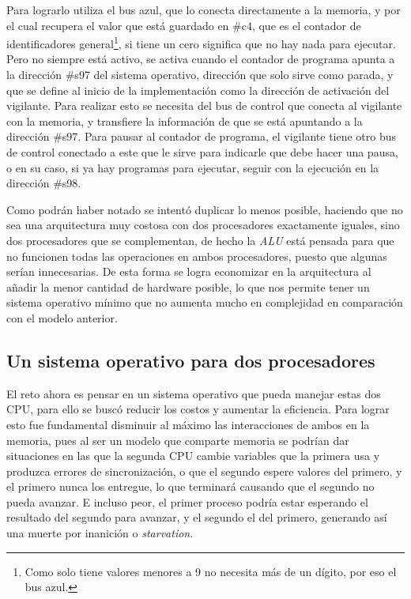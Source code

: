 \documentclass[letterpaper,12pt,oneside]{book}
\begin{document}
        Para lograrlo utiliza el bus azul, que lo conecta directamente a la memoria,
		y por el cual recupera el valor que está guardado en \#c4, que es el contador de identificadores general\footnote{Como solo tiene valores menores a 9
		no necesita más de un dígito, por eso el bus azul.}, si tiene un cero significa que no hay nada para ejecutar. Pero no siempre está activo, se activa cuando el contador de programa
apunta a la dirección \#s97 del sistema operativo, dirección que solo sirve como parada, y que se define al inicio
de la implementación como la dirección de activación del vigilante. Para realizar esto se necesita del  bus de control que conecta
al vigilante con la memoria, y transfiere la información de que se está apuntando a la dirección \#s97. Para pausar al contador
de programa, el vigilante tiene otro bus de control conectado a este que le sirve para indicarle que debe hacer una pausa, o en su caso, si
ya hay programas para ejecutar, seguir con la ejecución en la dirección \#s98.
	 	
	 	
		
		
		Como podrán haber notado se intentó duplicar lo menos posible, haciendo que no sea una arquitectura muy costosa con dos procesadores exactamente iguales,
		sino dos procesadores que se complementan, de hecho la \textit{ALU} está pensada para que no funcionen todas las operaciones en ambos procesadores,
		puesto que algunas serían innecesarias. De esta forma se logra economizar en la arquitectura al añadir la menor cantidad de hardware posible, lo  que nos permite tener un sistema operativo mínimo que no aumenta mucho en complejidad en comparación con el modelo anterior.
	 	
	 	\clearpage
	 	
	 	\subsection{Un sistema operativo para dos procesadores}
	 		
	 		El reto ahora es pensar en un sistema operativo que pueda manejar estas dos CPU, para ello se buscó reducir los costos
	 		y aumentar la eficiencia. Para lograr esto fue fundamental disminuir al máximo las interacciones de ambos en la memoria, pues al
	 		ser un modelo que comparte memoria se podrían dar situaciones en las que la segunda CPU cambie variables que la primera usa y produzca errores de sincronización,
	 		o que el segundo espere valores del primero, y el primero nunca los entregue, lo que terminará causando que el segundo no pueda avanzar. E incluso
	 		peor, el primer proceso podría estar esperando el resultado del segundo para avanzar, y el segundo el del primero, generando así
	 		una muerte por inanición o \textit{starvation}. 
    
\end{document}
